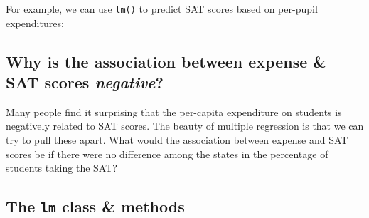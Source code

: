 \documentclass[]{book}
\newenvironment{Shaded}{\begin{snugshade}}{\end{snugshade}}
\newcommand{\KeywordTok}[1]{\textcolor[rgb]{0.13,0.29,0.53}{\textbf{#1}}}
\newcommand{\DataTypeTok}[1]{\textcolor[rgb]{0.13,0.29,0.53}{#1}}
\newcommand{\DecValTok}[1]{\textcolor[rgb]{0.00,0.00,0.81}{#1}}
\newcommand{\StringTok}[1]{\textcolor[rgb]{0.31,0.60,0.02}{#1}}
\newcommand{\CommentTok}[1]{\textcolor[rgb]{0.56,0.35,0.01}{\textit{#1}}}
\newcommand{\OperatorTok}[1]{\textcolor[rgb]{0.81,0.36,0.00}{\textbf{#1}}}
\newcommand{\NormalTok}[1]{#1}
\begin{document}
For example, we can use \texttt{lm()} to predict SAT scores based on
per-pupil expenditures:

\begin{Shaded}
\end{Shaded}

\subsection{\texorpdfstring{Why is the association between expense \&
SAT scores
\emph{negative}?}{Why is the association between expense \& SAT scores negative?}}\label{why-is-the-association-between-expense-sat-scores-negative}

Many people find it surprising that the per-capita expenditure on
students is negatively related to SAT scores. The beauty of multiple
regression is that we can try to pull these apart. What would the
association between expense and SAT scores be if there were no
difference among the states in the percentage of students taking the
SAT?

\begin{Shaded}
\end{Shaded}

\subsection{\texorpdfstring{The \texttt{lm} class \&
methods}{The lm class \& methods}}\label{the-lm-class-methods}
\end{document}
